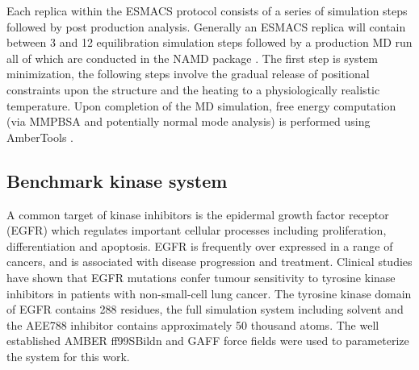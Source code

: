 Each replica within the ESMACS protocol consists of a series of simulation
steps followed by post production analysis. Generally an ESMACS replica will
contain between 3 and 12 equilibration simulation steps followed by a
production MD run all of which are conducted in the NAMD package
\cite{Phillips2005}. The first step is system minimization, the following
steps involve the gradual release of positional constraints upon the structure
and the heating to a physiologically realistic temperature. Upon completion of
the MD simulation, free energy computation (via MMPBSA and potentially normal
mode analysis) is performed using AmberTools \cite{amber14, Case2005,
MillerIII2012}.

\subsection{Benchmark kinase system}

A common target of kinase inhibitors is the epidermal growth factor receptor (EGFR) which regulates important cellular processes including proliferation, differentiation and apoptosis.
EGFR is frequently over expressed in a range of cancers, and is associated with disease progression and treatment. 
Clinical studies have shown that EGFR mutations confer tumour sensitivity to tyrosine kinase inhibitors in patients with non-small-cell lung cancer.
The tyrosine kinase domain of EGFR contains 288 residues, the full simulation system including solvent and the AEE788 inhibitor contains approximately 50 thousand atoms.
The well established AMBER ff99SBildn and GAFF force fields \cite{Maier2015, Wang2004} were used to parameterize the system for this work.
